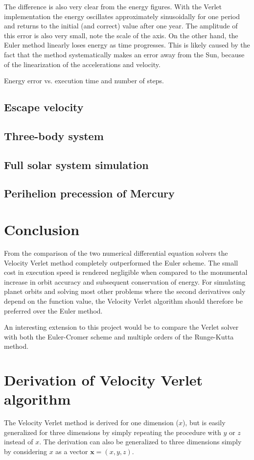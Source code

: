 \documentclass[aps,reprint]{revtex4-1}
\newcommand\blankpage{%
  \null
  \thispagestyle{empty}%
  \addtocounter{page}{-1}%
  \newpage}
\begin{document}
The difference is also very clear from the energy figures. With the Verlet
implementation the energy oscillates approximately sinusoidally for one period
and returns to the initial (and correct) value after one year. The amplitude of
this error is also very small, note the scale of the axis.
On the other hand, the Euler method linearly loses energy as time progresses. This
is likely caused by the fact that the method systematically makes an error away
from the Sun, because of the linearization of the accelerations and velocity.

Energy error vs. execution time and number of steps.

\subsection{Escape velocity}
\subsection{Three-body system}

\subsection{Full solar system simulation}


\subsection{Perihelion precession of Mercury}

\section{Conclusion}
\label{sec:conclusion}
From the comparison of the two numerical differential equation solvers the
Velocity Verlet method completely outperformed the Euler scheme. The small
cost in execution speed is rendered negligible when compared to the monumental
increase in orbit accuracy and subsequent conservation of energy. For simulating planet
orbits and solving most other problems where the second derivatives only depend
on the function value, the Velocity Verlet algorithm should therefore be
preferred over the Euler method.

An interesting extension to this project would be to compare the Verlet solver
with both the Euler-Cromer scheme and multiple orders of the Runge-Kutta method.

\blankpage
\appendix
\section{Derivation of Velocity Verlet algorithm}
\label{sec:velocityverlet}
The Velocity Verlet method is derived for one dimension ($x$), but is easily
generalized for three dimensions by simply repeating the procedure with $y$
or $z$ instead of $x$. The derivation can also be generalized to three dimensions
simply by considering $x$ as a vector $\mathbf{x} = (x, y, z)$.
\end{document}
